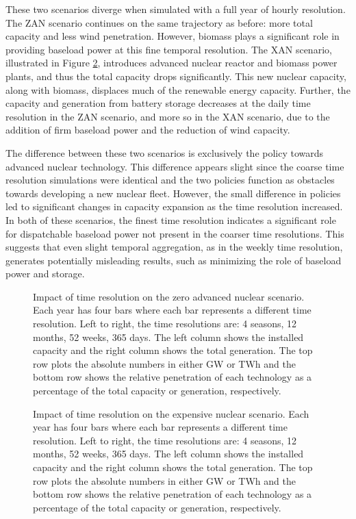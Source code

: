 These two scenarios diverge when simulated with a full year of hourly
resolution. The \gls{ZAN} scenario continues on the same trajectory as before:
more total capacity and less wind penetration. However, biomass plays
a significant role in providing baseload power at this fine temporal resolution.
The \gls{XAN} scenario, illustrated in Figure \ref{fig:time_res_XAN}, introduces
advanced nuclear reactor and biomass power plants, and
thus the total capacity drops significantly.  This new nuclear capacity, along
with biomass, displaces much of the renewable energy capacity.
Further, the capacity and generation from battery storage decreases
at the daily time resolution in the \gls{ZAN} scenario, and more so in the \gls{XAN}
scenario, due to the addition of firm baseload power and the reduction of wind
capacity.

The difference between these two scenarios is exclusively the policy
towards advanced nuclear technology. This difference appears slight since the coarse
time resolution simulations were identical and the two policies function as obstacles
towards developing a new nuclear fleet. However, the small difference in policies
led to significant changes in capacity expansion as the time resolution increased.
In both of these scenarios, the finest time resolution indicates a significant
role for dispatchable baseload power not present in the coarser time resolutions.
This suggests that even slight temporal aggregation, as in the weekly time resolution,
generates potentially misleading results, such as minimizing the role of baseload
power and storage.
\begin{figure}[H]
  \centering
  \resizebox{0.95\columnwidth}{!}{}
  \caption{Impact of time resolution on the zero advanced nuclear scenario.
  Each year has four bars where each bar represents a different time resolution.
  Left to right, the time resolutions are: 4 seasons, 12 months, 52 weeks, 365 days.
  The left column shows the installed capacity and the right column shows the
  total generation. The top row plots the absolute numbers in either GW or TWh
  and the bottom row shows the relative penetration of each technology as a
  percentage of the total capacity or generation, respectively.}
  \label{fig:time_res_ZAN}
\end{figure}
\begin{figure}[H]
  \centering
  \resizebox{0.95\columnwidth}{!}{}
  \caption{Impact of time resolution on the expensive nuclear scenario.
  Each year has four bars where each bar represents a different time resolution.
  Left to right, the time resolutions are: 4 seasons, 12 months, 52 weeks, 365 days.
  The left column shows the installed capacity and the right column shows the
  total generation. The top row plots the absolute numbers in either GW or TWh
  and the bottom row shows the relative penetration of each technology as a
  percentage of the total capacity or generation, respectively.}
  \label{fig:time_res_XAN}
\end{figure}


